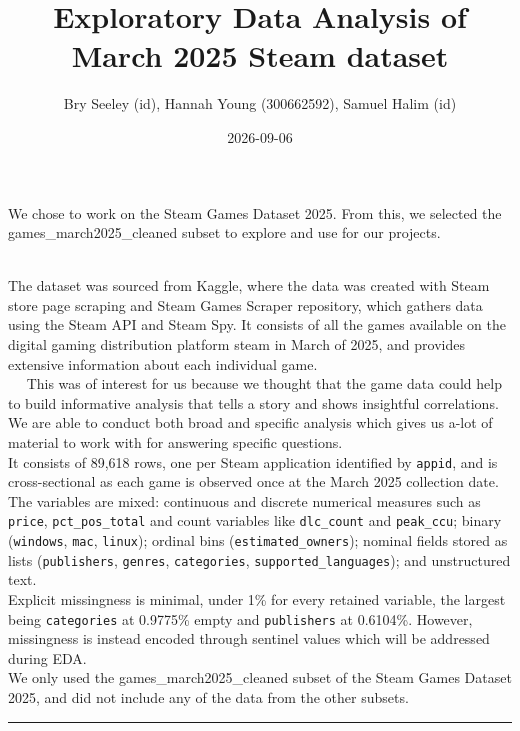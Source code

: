 \documentclass[
]{article}
\title{Exploratory Data Analysis of March 2025 Steam dataset}
\author{Bry Seeley (id), Hannah Young (300662592), Samuel Halim (id)}
\date{2026-09-06}
\begin{document}
\maketitle

\hfill\break

We chose to work on the Steam Games Dataset 2025. From this, we selected
the games\_march2025\_cleaned subset to explore and use for our
projects.\\
\strut \\

The dataset was sourced from Kaggle, where the data was created with
Steam store page scraping and Steam Games Scraper repository, which
gathers data using the Steam API and Steam Spy. It consists of all the
games available on the digital gaming distribution platform steam in
March of 2025, and provides extensive information about each individual
game.\\

  This was of interest for us because we thought that the game data
could help to build informative analysis that tells a story and shows
insightful correlations. We are able to conduct both broad and specific
analysis which gives us a-lot of material to work with for answering
specific questions.\\

It consists of 89,618 rows, one per Steam application identified by
\texttt{appid}, and is cross-sectional as each game is observed once at
the March 2025 collection date. The variables are mixed: continuous and
discrete numerical measures such as \texttt{price},
\texttt{pct\_pos\_total} and count variables like \texttt{dlc\_count}
and \texttt{peak\_ccu}; binary (\texttt{windows}, \texttt{mac},
\texttt{linux}); ordinal bins (\texttt{estimated\_owners}); nominal
fields stored as lists (\texttt{publishers}, \texttt{genres},
\texttt{categories}, \texttt{supported\_languages}); and unstructured
text.\\

Explicit missingness is minimal, under 1\% for every retained variable,
the largest being \texttt{categories} at 0.9775\% empty and
\texttt{publishers} at 0.6104\%. However, missingness is instead encoded
through sentinel values which will be addressed during EDA.\\

We only used the games\_march2025\_cleaned subset of the Steam Games
Dataset 2025, and did not include any of the data from the other
subsets.

\begin{center}\rule{0.5\linewidth}{0.5pt}\end{center}
\end{document}

